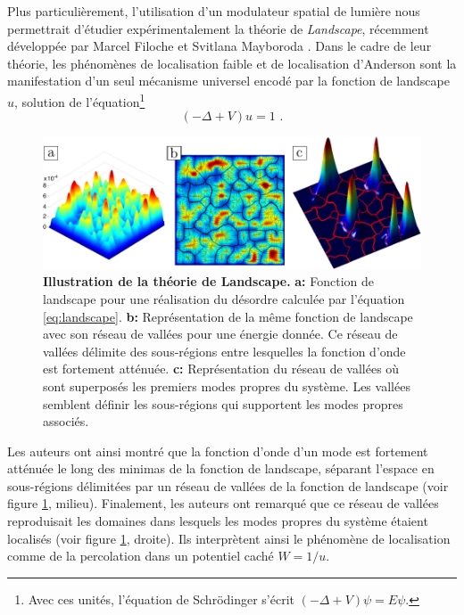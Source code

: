 Plus particulièrement, l'utilisation d'un modulateur spatial de lumière nous permettrait d'étudier expérimentalement la théorie de \emph{Landscape}, récemment développée par Marcel Filoche et Svitlana Mayboroda \citep{filoche2012universal}. Dans le cadre de leur théorie, les phénomènes de localisation faible et de localisation d'Anderson sont la manifestation d'un seul mécanisme universel encodé par la fonction de landscape $u$, solution de l'équation\footnote{Avec ces unités, l'équation de Schrödinger s'écrit $(-\Delta+V)\psi=E\psi$.}
\begin{equation}
(-\Delta+V)u=1 \text{ .}
\label{eq:landscape}
\end{equation}

\begin{figure}
\centering
\includegraphics[width=\textwidth]{Fig/Conclusion/landscape.pdf}
\caption{\textbf{Illustration de la théorie de Landscape.} \textbf{a:} Fonction de landscape pour une réalisation du désordre calculée par l'équation \ref{eq:landscape}. \textbf{b:} Représentation de la même fonction de landscape avec son réseau de vallées pour une énergie donnée. Ce réseau de vallées délimite des sous-régions entre lesquelles la fonction d'onde est fortement atténuée. \textbf{c:} Représentation du réseau de vallées où sont superposés les premiers modes propres du système. Les vallées semblent définir les sous-régions qui supportent les modes propres associés.}
\label{fig:landscape}
\end{figure}

Les auteurs ont ainsi montré que la fonction d'onde d'un mode est fortement atténuée le long des minimas de la fonction de landscape, séparant l'espace en sous-régions délimitées par un réseau de vallées de la fonction de landscape (voir figure \ref{fig:landscape}, milieu). Finalement, les auteurs ont remarqué que ce réseau de vallées reproduisait les domaines dans lesquels les modes propres du système étaient localisés (voir figure \ref{fig:landscape}, droite). Ils interprètent ainsi le phénomène de localisation comme de la percolation dans un potentiel caché $W=1/u$.

